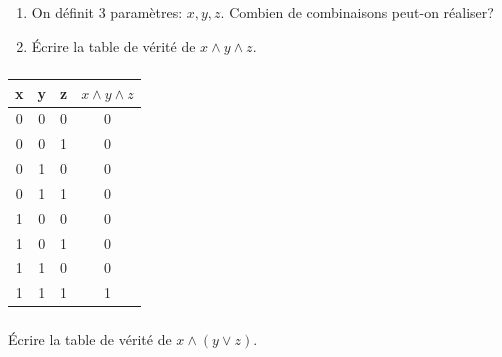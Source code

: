 \documentclass[svgnames,11pt]{beamer}
\begin{document}
\begin{frame}
    \frametitle{}

    \begin{activite}
        \begin{enumerate}
            \item On définit 3 paramètres: $x,y,z$. Combien de combinaisons peut-on réaliser?
            \item Écrire la table de vérité de $x\land y \land z$.
        \end{enumerate}
    \end{activite}

\end{frame}
\begin{frame}
    \frametitle{}

    \begin{center}
        \begin{tabular}{|c|c|c|c|}
            \hline
            x & y & z & $x\land y \land z$ \\
            \hline
            0 & 0 & 0 & 0                  \\
            \hline
            0 & 0 & 1 & 0                  \\
            \hline
            0 & 1 & 0 & 0                  \\
            \hline
            0 & 1 & 1 & 0                  \\
            \hline
            1 & 0 & 0 & 0                  \\
            \hline
            1 & 0 & 1 & 0                  \\
            \hline
            1 & 1 & 0 & 0                  \\
            \hline
            1 & 1 & 1 & 1                  \\
            \hline
        \end{tabular}
    \end{center}


\end{frame}
\begin{frame}
    \frametitle{}

    \begin{activite}Écrire la table de vérité de $x\land (y \lor z)$.
    \end{activite}

\end{frame}
\end{document}
